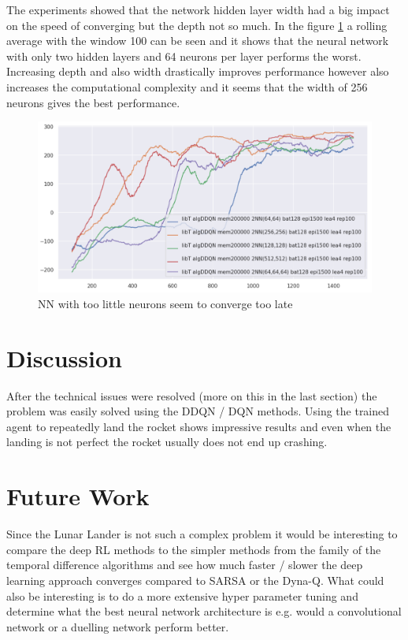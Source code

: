 \documentclass{article}
\begin{document}
The experiments showed that the network hidden layer width had a big impact on the speed of converging but the depth not so much. In the figure \ref{fig:3} a rolling average with the window 100 can be seen and it shows that the neural network with only two hidden layers and 64 neurons per layer performs the worst. Increasing depth and also width drastically improves performance however also increases the computational complexity and it seems that the width of 256 neurons gives the best performance.

\begin{figure}[!h]
  \centering
	\includegraphics[width=1.0\textwidth]{figures/nnwidth.png}
  \caption{NN with too little neurons seem to converge too late}
  \label{fig:3}
\end{figure}

\section{Discussion}
After the technical issues were resolved (more on this in the last section) the problem was easily solved using the DDQN / DQN methods. Using the trained agent to repeatedly land the rocket shows impressive results and even when the landing is not perfect the rocket usually does not end up crashing. 

\section{Future Work}
Since the Lunar Lander is not such a complex problem it would be interesting to compare the deep RL methods to the simpler methods from the family of the temporal difference algorithms and see how much faster / slower the deep learning approach converges compared to SARSA or the Dyna-Q. What could also be interesting is to do a more extensive hyper parameter tuning and determine what the best neural network architecture is e.g. would a convolutional network or a duelling network perform better.
\end{document}
